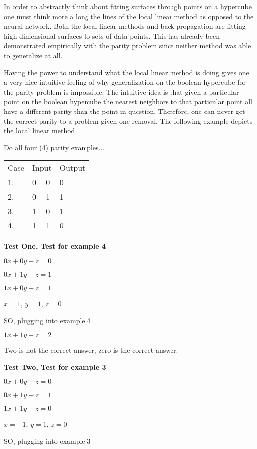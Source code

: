 	In order to abstractly think about fitting surfaces through
points on a hypercube one must think more a long the lines of the
local linear method as opposed to the neural network.  Both the local
linear methods and back propagation are fitting high dimensional
surfaces to sets of data points.  This has already been demonstrated
empirically with the parity problem since neither method was able to
generalize at all.

	Having the power to understand what the local linear method is
doing gives one a very nice intuitive feeling of why generalization on
the boolean hypercube for the parity problem is impossible.  The
intuitive idea is that given a particular point on the boolean
hypercube the nearest neighbors to that particular point all have a
different parity than the point in question.  Therefore, one can never
get the correct parity to a problem given one removal.  The
following example depicts the local linear method.

 Do all four (4) parity examples...

\begin{center}
\begin{tabular}{llll}
\multicolumn{1}{c}{Case} &
\multicolumn{2}{c}{Input} &
\multicolumn{1}{c}{Output} \\ 
1. & 0 & 0 & 0 \\
2. & 0 & 1 & 1 \\
3. & 1 & 0 & 1 \\
4. & 1 & 1 & 0 
\end{tabular}
\end{center}


 {\bf Test One,  Test for example 4}

	$0x + 0y + z = 0$

	$0x + 1y + z = 1$      

        $1x + 0y + z = 1$

        $x = 1$,  $y = 1$, $z = 0$

	SO, plugging into example 4

	$1x + 1y + z = 2$     

 Two is not the correct answer, zero is the correct answer.

 {\bf Test Two,  Test for example 3}

	$0x + 0y + z = 0$

	$0x + 1y + z = 1$
      
	$1x + 1y + z = 0$

	$x = -1$,  $y = 1$,  $z = 0$

        SO, plugging into example 3

